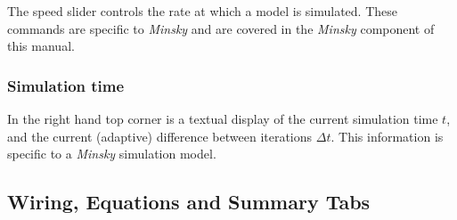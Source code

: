 The speed slider controls the rate at which a model is simulated.
These commands are specific to \emph{Minsky} and are covered in the
\emph{Minsky} component of this manual.

\subsubsection{Simulation time}

In the right hand top corner is a textual display of the current simulation
time $t$, and the current (adaptive) difference between iterations
$\Delta t$. This information is specific to a \emph{Minsky} simulation
model.

\subsection{Wiring, Equations and Summary Tabs}

\label{WiringEquationsTab}\label{tabs:wiring}



